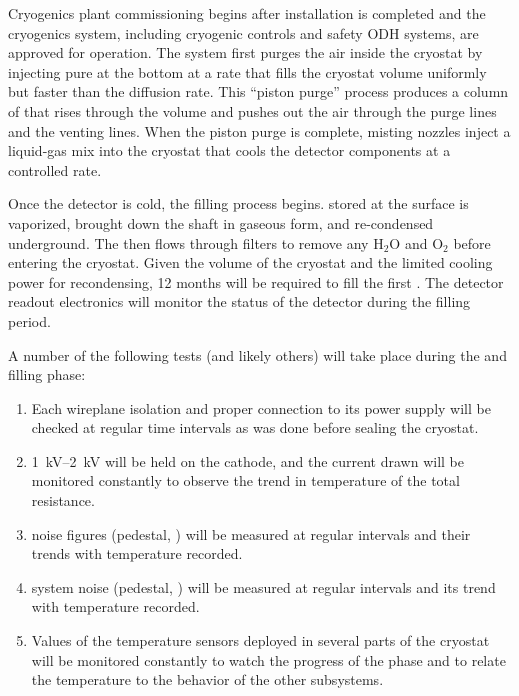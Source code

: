 Cryogenics plant commissioning begins after installation is completed and the cryogenics system, including cryogenic controls and safety ODH systems, are approved for operation.
The system first purges the air inside the cryostat  by injecting pure  at the bottom  at a rate that fills the cryostat volume uniformly but faster than the diffusion rate. This ``piston purge'' process produces a column of   that rises through the volume and pushes out the air through the  purge lines and the  venting lines.  When the piston purge is complete, misting nozzles inject a liquid-gas mix into the cryostat that cools the detector components at a controlled rate. 


Once the detector is cold, the filling process begins.  stored at the surface  
is vaporized, brought down the shaft in gaseous form, and re-condensed underground. The \lar then flows through filters to remove any H$_2$O and O$_2$ before entering the cryostat. Given the volume of the cryostat and the limited cooling power for recondensing, \num{12} months will be required to fill the first . The detector readout electronics will  monitor the status of the detector during the filling period. 



A number of the following tests (and likely others) will  take place during the \cooldown and filling phase: 

\begin{enumerate}


    \item Each  wireplane isolation and proper connection to its  power supply will be checked at regular time intervals as was done before sealing the cryostat.
    
    \item \SIrange{1}{2}{kV} will be held on the cathode, and the current drawn will be  monitored constantly to observe the trend in temperature of the total resistance.
    
    \item {} noise figures (pedestal, ) will be measured at regular intervals and their trends with temperature recorded.
    
    \item {} system noise (pedestal, ) will be measured at regular intervals and its trend with temperature recorded.
    
     \item Values of the temperature sensors deployed in several parts of the cryostat will be monitored constantly to watch the progress of the \cooldown phase and to relate the temperature to the behavior of the other  subsystems. 
     
\end{enumerate}

